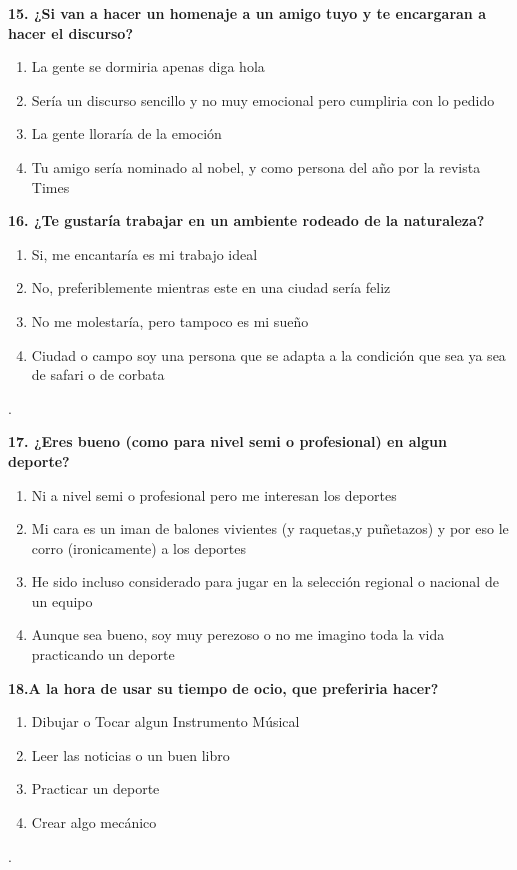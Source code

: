 \documentclass{article}
\begin{document}
\pagebreak
\textbf{15. ¿Si van a hacer un homenaje a un amigo tuyo y te encargaran a hacer el discurso?}
\begin{enumerate}[label=(\Alph*)] 
\item La gente  se dormiria apenas diga hola
\item Sería un discurso sencillo y no muy emocional pero cumpliria con lo pedido
\item La gente lloraría de la emoción
\item Tu amigo sería nominado al nobel, y como persona del año por la revista Times
\end{enumerate}


\textbf{16. ¿Te gustaría trabajar en un ambiente rodeado de la naturaleza?}
\begin{enumerate}[label=(\Alph*)]
\item Si, me encantaría es mi trabajo ideal
\item No, preferiblemente mientras este en una ciudad sería feliz
\item No me molestaría, pero tampoco es mi sueño
\item Ciudad o campo soy una persona que se adapta a la condición que sea ya sea de safari o de corbata
 \end{enumerate}. 


\textbf{17. ¿Eres bueno (como para nivel semi o profesional) en algun deporte?}
\begin{enumerate}[label=(\Alph*)]
\item Ni a nivel semi o profesional pero me interesan los deportes
\item Mi cara es un iman de balones vivientes (y raquetas,y puñetazos) y por eso le corro (ironicamente) a los deportes
\item He sido incluso considerado para jugar en la selección regional o nacional de un equipo
\item Aunque sea bueno, soy muy perezoso o no me imagino toda la vida practicando un deporte
\end{enumerate} 

\textbf{18.A la hora de usar su tiempo de ocio, que preferiria hacer?} 
\begin{enumerate}[label=(\Alph*)]
\item Dibujar o Tocar algun Instrumento Músical
\item Leer las noticias o un buen libro
\item Practicar un deporte
\item Crear algo mecánico
\end{enumerate}.
\end{document}
